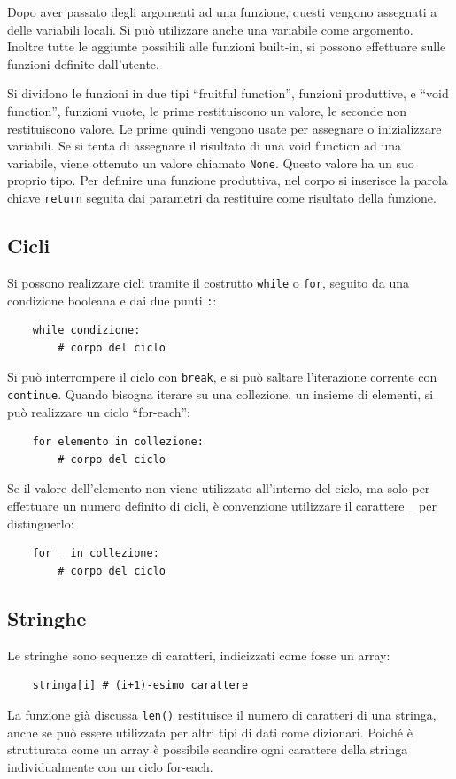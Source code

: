 \documentclass{article}
\numberwithin{equation}{subsection}
\begin{document}
Dopo aver passato degli argomenti ad una funzione, questi vengono assegnati a delle variabili locali. Si può utilizzare anche una variabile come argomento. Inoltre 
tutte le aggiunte possibili alle funzioni built-in, si possono effettuare sulle funzioni definite dall'utente. 

Si dividono le funzioni in due tipi ``fruitful function'', funzioni produttive, e ``void function'', funzioni vuote,  le prime restituiscono un valore, le seconde non restituiscono valore. Le prime quindi 
vengono usate per assegnare o inizializzare variabili. Se si tenta di assegnare il risultato di una void function ad una variabile, viene ottenuto un valore chiamato \verb|None|. 
Questo valore ha un suo proprio tipo. Per definire una funzione produttiva, nel corpo si inserisce la parola chiave \verb|return| seguita dai parametri da restituire come 
risultato della funzione. 

\subsection{Cicli}

Si possono realizzare cicli tramite il costrutto \verb|while| o \verb|for|, seguito da una condizione booleana e dai due punti \verb|:|:
\begin{verbatim}
    while condizione: 
        # corpo del ciclo
\end{verbatim}

Si può interrompere il ciclo con \verb|break|, e si può saltare l'iterazione corrente con \verb|continue|. Quando bisogna iterare su una collezione, un insieme di elementi, 
si può realizzare un ciclo ``for-each'': 
\begin{verbatim}
    for elemento in collezione: 
        # corpo del ciclo
\end{verbatim}

Se il valore dell'elemento non viene utilizzato all'interno del ciclo, ma solo per effettuare un numero definito di cicli, è convenzione utilizzare il carattere \verb|_| per distinguerlo:
\begin{verbatim}
    for _ in collezione:
        # corpo del ciclo 
\end{verbatim}

\subsection{Stringhe}

Le stringhe sono sequenze di caratteri, indicizzati come fosse un array:
\begin{verbatim}
    stringa[i] # (i+1)-esimo carattere
\end{verbatim}
La funzione già discussa \verb|len()| restituisce il numero di caratteri di una stringa, 
anche se può essere utilizzata per altri tipi di dati come dizionari. Poiché è strutturata come un array è possibile scandire ogni carattere della stringa individualmente 
con un ciclo for-each. 
\end{document}
